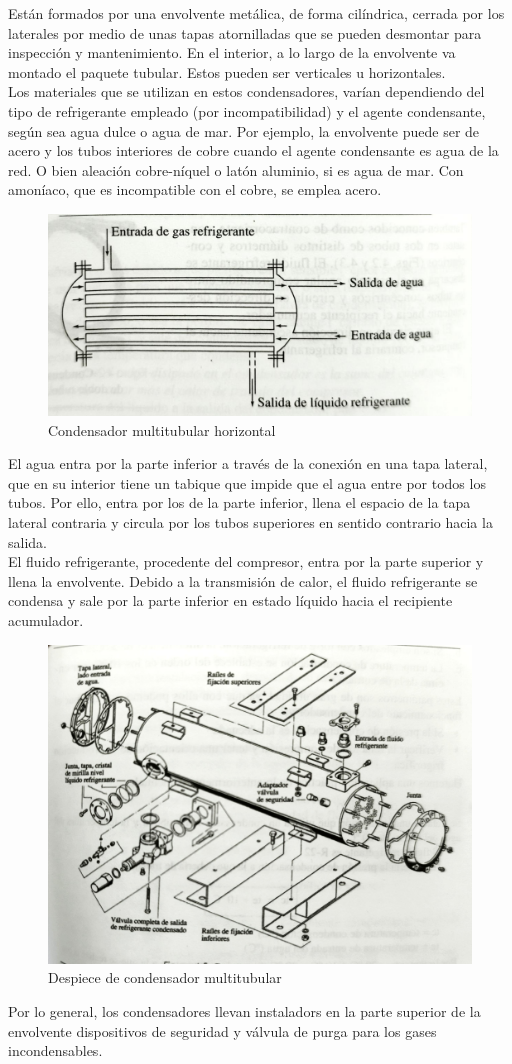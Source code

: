 Est\'an formados por una envolvente met\'alica, de forma cil\'indrica, cerrada por los laterales por medio de unas tapas atornilladas que se pueden desmontar para inspecci\'on y mantenimiento. En el interior, a lo largo de la envolvente va montado el paquete tubular. Estos pueden ser verticales u horizontales.\\Los materiales que se utilizan en estos condensadores, var\'ian dependiendo del tipo de refrigerante empleado (por incompatibilidad) y el agente condensante, seg\'un sea agua dulce o agua de mar. Por ejemplo, la envolvente puede ser de acero y los tubos interiores de cobre cuando el agente condensante es agua de la red. O bien aleaci\'on cobre-n\'iquel o lat\'on aluminio, si es agua de mar. Con amon\'iaco, que es incompatible con el cobre, se emplea acero.
\begin{figure}[H]
    \centering
    \includegraphics[width=0.6\linewidth]{figuras/condensadores/Condensador multitubular horizontal.jpg}
    \caption{Condensador multitubular horizontal}
    \label{fig:Condensador multitubular horizontal}
\end{figure}
El agua entra por la parte inferior a trav\'es de la conexi\'on en una tapa lateral, que en su interior tiene un tabique que impide que el agua entre por todos los tubos. Por ello, entra por los de la parte inferior, llena el espacio de la tapa lateral contraria y circula por los tubos superiores en sentido contrario hacia la salida.\\El fluido refrigerante, procedente del compresor, entra por la parte superior y llena la envolvente. Debido a la transmisi\'on de calor, el fluido refrigerante se condensa y sale por la parte inferior en estado l\'iquido hacia el recipiente acumulador.
\begin{figure}[H]
    \centering
    \includegraphics[width=0.6\linewidth]{figuras/condensadores/Despiece de condensador multitubular.jpg}
    \caption{Despiece de condensador multitubular}
    \label{fig:Despiece de condensador multitubular}
\end{figure}
Por lo general, los condensadores llevan instaladors en la parte superior de la envolvente dispositivos de seguridad y v\'alvula de purga para los gases incondensables.

